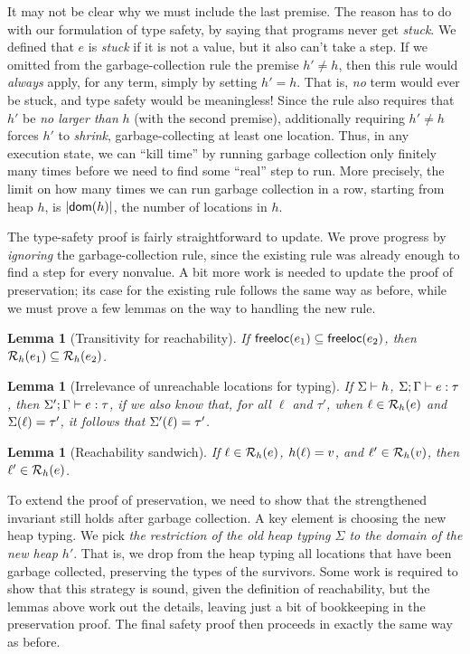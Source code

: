 \documentclass{amsbook}
\newtheorem{lemma}[theorem]{Lemma}
\theoremstyle{definition}
\theoremstyle{remark}
\numberwithin{section}{chapter}
\numberwithin{equation}{chapter}
\begin{document}
It may not be clear why we must include the last premise.
The reason has to do with our formulation of type safety, by saying that programs never get \emph{stuck}.
We defined that $e$ is \emph{stuck} if it is not a value, but it also can't take a step.
If we omitted from the garbage-collection rule the premise $h' \neq h$, then this rule would \emph{always} apply, for any term, simply by setting $h' = h$.
That is, \emph{no} term would ever be stuck, and type safety would be meaningless!
Since the rule also requires that $h'$ be \emph{no larger than} $h$ (with the second premise), additionally requiring $h' \neq h$ forces $h'$ to \emph{shrink}, garbage-collecting at least one location.
Thus, in any execution state, we can ``kill time'' by running garbage collection only finitely many times before we need to find some ``real'' step to run.
More precisely, the limit on how many times we can run garbage collection in a row, starting from heap $h$, is $|\mathsf{dom}(h)|$, the number of locations in $h$.

The type-safety proof is fairly straightforward to update.
We prove progress by \emph{ignoring} the garbage-collection rule, since the existing rule was already enough to find a step for every nonvalue.
A bit more work is needed to update the proof of preservation; its case for the existing rule follows the same way as before, while we must prove a few lemmas on the way to handling the new rule.

\begin{lemma}[Transitivity for reachability]
  If $\mathsf{freeloc}(e_1) \subseteq \mathsf{freeloc}(e_2)$, then $\mathcal R_{h}(e_1) \subseteq \mathcal R_{h}(e_2)$.
\end{lemma}

\begin{lemma}[Irrelevance of unreachable locations for typing]
  If $\Sigma \vdash h$, $\Sigma; \Gamma \vdash e : \tau$, then $\Sigma'; \Gamma \vdash e : \tau$, if we also know that, for all $\ell$ and $\tau'$, when $\ell \in \mathcal R_{h}(e)$ and $\Sigma(\ell) = \tau'$, it follows that $\Sigma'(\ell) = \tau'$.
\end{lemma}

\begin{lemma}[Reachability sandwich]
  If $\ell \in \mathcal R_{h}(e)$, $h(\ell) = v$, and $\ell' \in \mathcal R_{h}(v)$, then $\ell' \in \mathcal R_{h}(e)$.
\end{lemma}

To extend the proof of preservation, we need to show that the strengthened invariant still holds after garbage collection.
A key element is choosing the new heap typing.
We pick \emph{the restriction of the old heap typing $\Sigma$ to the domain of the new heap $h'$}.
That is, we drop from the heap typing all locations that have been garbage collected, preserving the types of the survivors.
Some work is required to show that this strategy is sound, given the definition of reachability, but the lemmas above work out the details, leaving just a bit of bookkeeping in the preservation proof.
The final safety proof then proceeds in exactly the same way as before.
\end{document}
